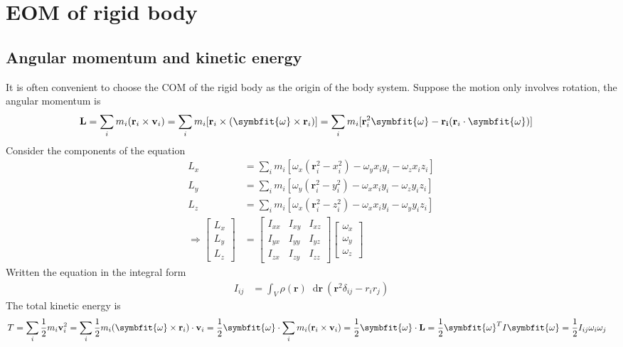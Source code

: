 \documentclass[twoside,9pt]{article}
\numberwithin{equation}{section} %
\renewcommand*\d{\mathop{}\!\mathrm{d}}
\theoremstyle{definition}
\theoremstyle{remark}
\begin{document}
\newpage
\section{EOM of rigid body}
\subsection{Angular momentum and kinetic energy}
It is often convenient to choose the COM of the rigid body as the origin
of the body system.
Suppose the motion only involves rotation, the angular momentum is
\begin{align}
    \mathbf{L} &= 
    \sum_i m_i (\mathbf{r}_i\times\mathbf{v}_i)
    = \sum_i m_i [\mathbf{r}_i\times(\symbfit{\omega}\times\mathbf{r}_i)]
    = \sum_i m_i[\mathbf{r}_i^2\symbfit{\omega} - \mathbf{r_i}(\mathbf{r}_i
    \cdot\symbfit{\omega})]
\end{align}
Consider the components of the equation
\begin{align}
    L_x &= \sum_i m_i[\omega_x(\mathbf{r}_i^2 - x_i^2) - \omega_yx_iy_i-\omega_z x_iz_i]\\
    L_y &= \sum_i m_i[\omega_y(\mathbf{r}_i^2 - y_i^2) - \omega_xx_iy_i-\omega_z y_iz_i]\\
    L_z &= \sum_i m_i[\omega_x(\mathbf{r}_i^2 - z_i^2) - \omega_xx_iy_i-\omega_y y_iz_i]\\
    \Rightarrow
    \begin{bmatrix}
        L_x\\L_y\\L_z
    \end{bmatrix} &=
    \begin{bmatrix}
        I_{xx} & I_{xy} & I_{xz}\\
        I_{yx} & I_{yy} & I_{yz}\\
        I_{zx} & I_{zy} & I_{zz}
    \end{bmatrix}
    \begin{bmatrix}
        \omega_x\\ \omega_y\\ \omega_z
    \end{bmatrix}
\end{align}
Written the equation in the integral form
\begin{align}
    I_{ij} &= 
    \int_V\rho(\mathbf{r})\d\mathbf{r}\ (\mathbf{r}^2\delta_{ij} - r_ir_j)
\end{align}
The total kinetic energy is
\begin{align}
    T 
    &= \sum_i \frac{1}{2}m_i\mathbf{v}_i^2
    = \sum_i \frac{1}{2}m_i(\symbfit{\omega}\times\mathbf{r}_i)\cdot\mathbf{v}_i
    = \frac{1}{2}\symbfit{\omega}\cdot\sum_i m_i(\mathbf{r}_i\times\mathbf{v}_i)
    = \frac{1}{2}\symbfit{\omega}\cdot\mathbf{L}
    = \frac{1}{2}\symbfit{\omega}^T I\symbfit{\omega}
    = \frac{1}{2}I_{ij}\omega_i\omega_j
\end{align}
\end{document}
